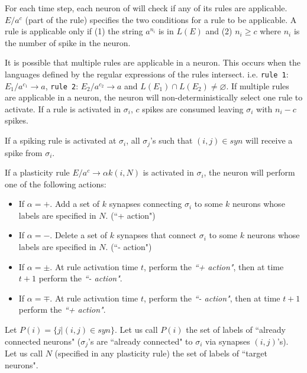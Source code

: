 \documentclass[smallextended]{svjour3}
\begin{document}

 
For each time step, each neuron of will check if any of its rules are applicable. $E/a^c$ (part of the rule) specifies the two conditions for a rule
to be applicable. A rule is applicable only if (1) the string $a^{n_i}$ is in $L(E)$ and  (2) $n_i \geq c$ where $n_i$ is the number of spike in the
neuron.

It is possible that multiple rules are applicable in a neuron. This occurs when the languages defined by the regular expressions of the rules 
intersect. i.e. \texttt{rule 1}: $E_1/a^{c_1} \rightarrow a$, \texttt{rule 2}: $E_2/a^{c_2} \rightarrow a$ and $L(E_1) \cap L(E_2) \neq \varnothing$. 
If multiple rules are applicable in a neuron, the neuron will non-deterministically select one rule to activate. If a rule is activated in $\sigma_i$,
$c$ spikes are consumed leaving $\sigma_i$ with $n_i-c$ spikes.
  
If a spiking rule is activated at $\sigma_i$, all $\sigma_j$'s such that $(i,j) \in syn$ will receive a spike from $\sigma_i$.
  
If a plasticity rule $E/a^c \rightarrow \alpha k(i, {N})$ is activated in $\sigma_i$, the neuron will perform one of the following actions:
\begin{itemize}
   \item If $\alpha = +$. Add a set of $k$ synapses connecting $\sigma_i$ to some $k$ neurons whose labels are specified in $N$. (``+ action")
   \item If $\alpha = -$. Delete a set of $k$ synapses that connect $\sigma_i$ to some $k$ neurons whose labels are specified in $N$. (``- action")
   \item If $\alpha = \pm$. At rule activation time $t$, perform the \textit{``+ action"}, then at time $t+1$ perform the \textit{``- action"}.
   \item If $\alpha = \mp$. At rule activation time $t$, perform the \textit{``- action"}, then at time $t+1$ perform the \textit{``+ action"}.
\end{itemize}
  
Let $P(i) = \{j|(i,j)\in syn\}$. Let us call $P(i)$ the set of labels of ``already connected neurons" ($\sigma_j$'s are ``already connected" to 
$\sigma_i$ via synapses $(i,j)$'s). Let us call $N$ (specified in any plasticity rule) the set of labels of ``target neurons".
\end{document}
